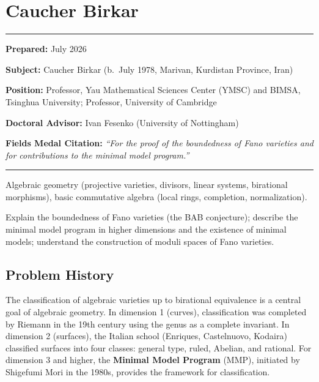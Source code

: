 \chapter{Caucher Birkar}\label{ch2018caucherbirkar:caucher-birkar-fields-medal-2018-a-comprehensive-report-on-his-work-and-impact}

\begin{center}\rule{0.5\linewidth}{0.5pt}\end{center}

\textbf{Prepared:} July 2026

\textbf{Subject:} Caucher Birkar (b.\ July 1978, Marivan, Kurdistan Province, Iran)

\textbf{Position:} Professor, Yau Mathematical Sciences Center (YMSC) and BIMSA, Tsinghua University; Professor, University of Cambridge

\textbf{Doctoral Advisor:} Ivan Fesenko (University of Nottingham)

\textbf{Fields Medal Citation:} \emph{``For the proof of the boundedness of Fano varieties and for contributions to the minimal model program.''}

\begin{center}\rule{0.5\linewidth}{0.5pt}\end{center}

\begin{prereqs}
Algebraic geometry (projective varieties, divisors, linear systems, birational morphisms), basic commutative algebra (local rings, completion, normalization).
\end{prereqs}

\begin{objectives}
Explain the boundedness of Fano varieties (the BAB conjecture); describe the minimal model program in higher dimensions and the existence of minimal models; understand the construction of moduli spaces of Fano varieties.
\end{objectives}

\section{Problem History}

The classification of algebraic varieties up to birational equivalence is a central goal of algebraic geometry. In dimension 1 (curves), classification was completed by Riemann in the 19th century using the genus as a complete invariant. In dimension 2 (surfaces), the Italian school (Enriques, Castelnuovo, Kodaira) classified surfaces into four classes: general type, ruled, Abelian, and rational. For dimension 3 and higher, the \textbf{Minimal Model Program} (MMP), initiated by Shigefumi Mori in the 1980s, provides the framework for classification.

